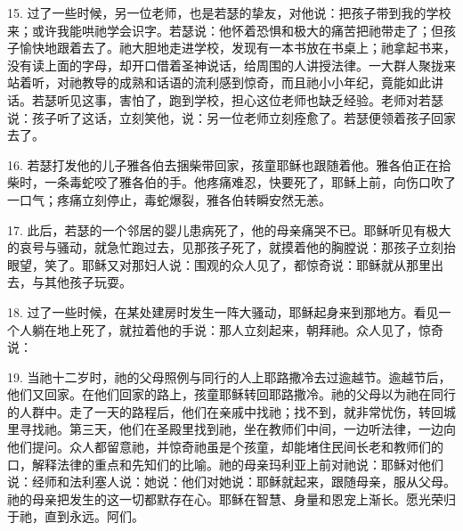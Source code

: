 15. 过了一些时候，另一位老师，也是若瑟的挚友，对他说：把孩子带到我的学校来；或许我能哄祂学会识字。若瑟说：他怀着恐惧和极大的痛苦把祂带走了；但孩子愉快地跟着去了。祂大胆地走进学校，发现有一本书放在书桌上；祂拿起书来，没有读上面的字母，却开口借着圣神说话，给周围的人讲授法律。一大群人聚拢来站着听，对祂教导的成熟和话语的流利感到惊奇，而且祂小小年纪，竟能如此讲话。若瑟听见这事，害怕了，跑到学校，担心这位老师也缺乏经验。老师对若瑟说：孩子听了这话，立刻笑他，说：另一位老师立刻痊愈了。若瑟便领着孩子回家去了。\par

16. 若瑟打发他的儿子雅各伯去捆柴带回家，孩童耶稣也跟随着他。雅各伯正在拾柴时，一条毒蛇咬了雅各伯的手。他疼痛难忍，快要死了，耶稣上前，向伤口吹了一口气；疼痛立刻停止，毒蛇爆裂，雅各伯转瞬安然无恙。\par

17. 此后，若瑟的一个邻居的婴儿患病死了，他的母亲痛哭不已。耶稣听见有极大的哀号与骚动，就急忙跑过去，见那孩子死了，就摸着他的胸膛说：那孩子立刻抬眼望，笑了。耶稣又对那妇人说：围观的众人见了，都惊奇说：耶稣就从那里出去，与其他孩子玩耍。\par

18. 过了一些时候，在某处建房时发生一阵大骚动，耶稣起身来到那地方。看见一个人躺在地上死了，就拉着他的手说：那人立刻起来，朝拜祂。众人见了，惊奇说：\par

19. 当祂十二岁时，祂的父母照例与同行的人上耶路撒冷去过逾越节。逾越节后，他们又回家。在他们回家的路上，孩童耶稣转回耶路撒冷。祂的父母以为祂在同行的人群中。走了一天的路程后，他们在亲戚中找祂；找不到，就非常忧伤，转回城里寻找祂。第三天，他们在圣殿里找到祂，坐在教师们中间，一边听法律，一边向他们提问。众人都留意祂，并惊奇祂虽是个孩童，却能堵住民间长老和教师们的口，解释法律的重点和先知们的比喻。祂的母亲玛利亚上前对祂说：耶稣对他们说：经师和法利塞人说：她说：他们对她说：耶稣就起来，跟随母亲，服从父母。祂的母亲把发生的这一切都默存在心。耶稣在智慧、身量和恩宠上渐长。愿光荣归于祂，直到永远。阿们。\par

